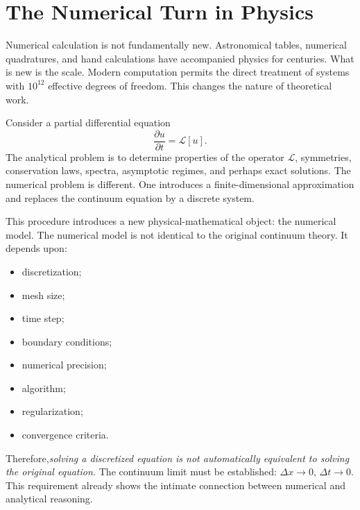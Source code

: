 \section{ The Numerical Turn in Physics}
\label{nm:tp}

Numerical calculation is not fundamentally new. Astronomical tables, numerical 
quadratures, and hand calculations have accompanied physics for centuries.
What is new is the scale.
Modern computation permits the direct treatment of systems with $10^{12}$
effective degrees of freedom.
This changes the nature of theoretical work.

Consider a partial differential equation
\[\frac{\partial u}{\partial t}=\mathcal{L}[u].\]
The analytical problem is to determine properties of the operator
$\mathcal{L}$, symmetries, conservation laws, spectra, asymptotic regimes, and
perhaps exact solutions.
The numerical problem is different. One introduces a finite-dimensional approximation
and replaces the continuum equation by a discrete system.

This procedure introduces a new physical-mathematical object: the numerical model.
The numerical model is not identical to the original continuum theory.
It depends upon:
\begin{itemize}
\item discretization;
\item mesh size;
\item time step;
\item boundary conditions;
\item numerical precision;
\item algorithm;
\item regularization;
\item convergence criteria.
\end{itemize}
Therefore,\emph{solving a discretized equation is not automatically equivalent 
to solving the original equation.}
The continuum limit must be established: $\Delta x\rightarrow 0$, 
$\Delta t\rightarrow 0$.
This requirement already shows the intimate connection between numerical 
and analytical reasoning.

